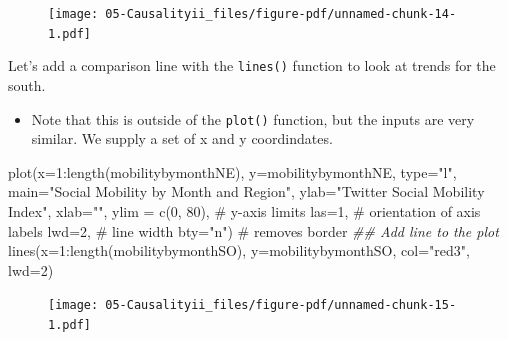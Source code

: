 \documentclass[
  letterpaper,
  DIV=11,
  numbers=noendperiod]{scrreprt}
\newenvironment{Shaded}{\begin{snugshade}}{\end{snugshade}}
\newcommand{\AttributeTok}[1]{\textcolor[rgb]{0.40,0.45,0.13}{#1}}
\newcommand{\CommentTok}[1]{\textcolor[rgb]{0.37,0.37,0.37}{#1}}
\newcommand{\DecValTok}[1]{\textcolor[rgb]{0.68,0.00,0.00}{#1}}
\newcommand{\DocumentationTok}[1]{\textcolor[rgb]{0.37,0.37,0.37}{\textit{#1}}}
\newcommand{\FunctionTok}[1]{\textcolor[rgb]{0.28,0.35,0.67}{#1}}
\newcommand{\NormalTok}[1]{\textcolor[rgb]{0.00,0.23,0.31}{#1}}
\newcommand{\SpecialCharTok}[1]{\textcolor[rgb]{0.37,0.37,0.37}{#1}}
\newcommand{\StringTok}[1]{\textcolor[rgb]{0.13,0.47,0.30}{#1}}
\providecommand{\tightlist}{%
  \setlength{\itemsep}{0pt}\setlength{\parskip}{0pt}}\usepackage{longtable,booktabs,array}
\begin{document}
\begin{figure}[H]

{\centering \texttt{[image: 05-Causalityii\_files/figure-pdf/unnamed-chunk-14-1.pdf]}

}

\end{figure}

Let's add a comparison line with the \texttt{lines()} function to look
at trends for the south.

\begin{itemize}
\tightlist
\item
  Note that this is outside of the \texttt{plot()} function, but the
  inputs are very similar. We supply a set of x and y coordindates.
\end{itemize}

\begin{Shaded}
\begin{Highlighting}[]
\FunctionTok{plot}\NormalTok{(}\AttributeTok{x=}\DecValTok{1}\SpecialCharTok{:}\FunctionTok{length}\NormalTok{(mobilitybymonthNE),}
     \AttributeTok{y=}\NormalTok{mobilitybymonthNE,}
     \AttributeTok{type=}\StringTok{"l"}\NormalTok{, }
     \AttributeTok{main=}\StringTok{"Social Mobility by Month and Region"}\NormalTok{,}
     \AttributeTok{ylab=}\StringTok{"Twitter Social Mobility Index"}\NormalTok{,}
     \AttributeTok{xlab=}\StringTok{""}\NormalTok{,}
     \AttributeTok{ylim =} \FunctionTok{c}\NormalTok{(}\DecValTok{0}\NormalTok{, }\DecValTok{80}\NormalTok{), }\CommentTok{\# y{-}axis limits}
     \AttributeTok{las=}\DecValTok{1}\NormalTok{, }\CommentTok{\# orientation of axis labels}
     \AttributeTok{lwd=}\DecValTok{2}\NormalTok{, }\CommentTok{\# line width}
     \AttributeTok{bty=}\StringTok{"n"}\NormalTok{) }\CommentTok{\# removes border}
\DocumentationTok{\#\# Add line to the plot }
\FunctionTok{lines}\NormalTok{(}\AttributeTok{x=}\DecValTok{1}\SpecialCharTok{:}\FunctionTok{length}\NormalTok{(mobilitybymonthSO),}
     \AttributeTok{y=}\NormalTok{mobilitybymonthSO, }\AttributeTok{col=}\StringTok{"red3"}\NormalTok{, }\AttributeTok{lwd=}\DecValTok{2}\NormalTok{)}
\end{Highlighting}
\end{Shaded}

\begin{figure}[H]

{\centering \texttt{[image: 05-Causalityii\_files/figure-pdf/unnamed-chunk-15-1.pdf]}

}

\end{figure}
\end{document}
